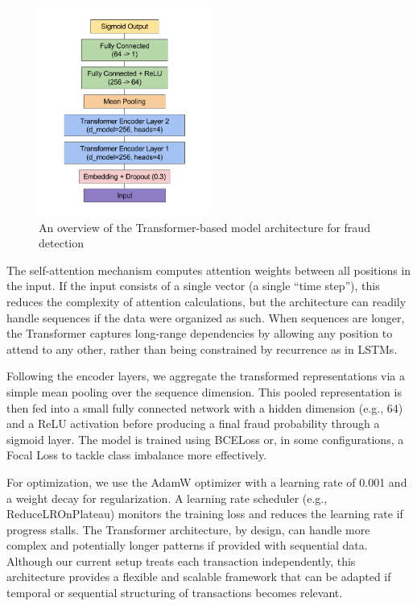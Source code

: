 \documentclass[11pt, oneside]{article}   	%
\begin{document}
\begin{figure}[H]
    \centering
    \includegraphics[width=0.5\textwidth]{images/transformer_architecture.pdf}
    \caption{An overview of the Transformer-based model architecture for fraud detection}
    \label{fig:transformer_arch}
\end{figure}

The self-attention mechanism computes attention weights between all positions in the input. If the input consists of a single vector (a single “time step”), this reduces the complexity of attention calculations, but the architecture can readily handle sequences if the data were organized as such. When sequences are longer, the Transformer captures long-range dependencies by allowing any position to attend to any other, rather than being constrained by recurrence as in LSTMs.

Following the encoder layers, we aggregate the transformed representations via a simple mean pooling over the sequence dimension. This pooled representation is then fed into a small fully connected network with a hidden dimension (e.g., 64) and a ReLU activation before producing a final fraud probability through a sigmoid layer. The model is trained using BCELoss or, in some configurations, a Focal Loss to tackle class imbalance more effectively.

For optimization, we use the AdamW optimizer with a learning rate of 0.001 and a weight decay for regularization. A learning rate scheduler (e.g., ReduceLROnPlateau) monitors the training loss and reduces the learning rate if progress stalls. The Transformer architecture, by design, can handle more complex and potentially longer patterns if provided with sequential data. Although our current setup treats each transaction independently, this architecture provides a flexible and scalable framework that can be adapted if temporal or sequential structuring of transactions becomes relevant.
\end{document}
